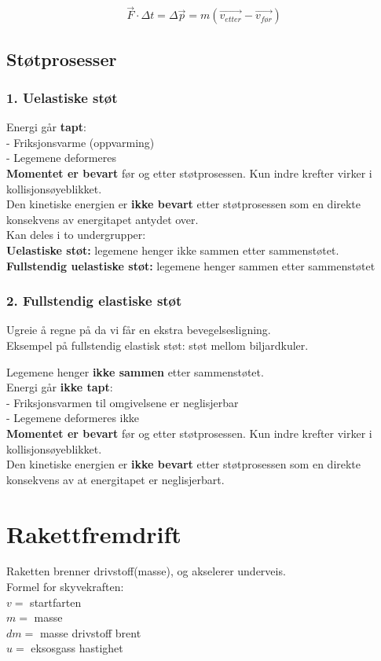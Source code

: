 \documentclass[12pt]{article}
\begin{document}
$$\Vec{F}\cdot \Delta t = \Delta \Vec{p} = m(\Vec{v_{etter}} - \Vec{v_{før}})$$


\subsection{Støtprosesser}
\bigskip
\subsubsection{1. Uelastiske støt}
Energi går \textbf{tapt}:\\
- Friksjonsvarme (oppvarming)\\
- Legemene deformeres\\
\bigskip
\textbf{Momentet er bevart} før og etter støtprosessen. Kun indre krefter virker i kollisjonsøyeblikket.\\
\bigskip
Den kinetiske energien er \textbf{ikke bevart} etter støtprosessen som en direkte konsekvens av energitapet antydet over.\\
\bigskip
 Kan deles i to undergrupper: \\
 \textbf{Uelastiske støt:} legemene henger ikke sammen etter sammenstøtet.\\
 \textbf{Fullstendig uelastiske støt:} legemene henger sammen etter sammenstøtet\\
 \bigskip
\subsubsection{2. Fullstendig elastiske støt}
Ugreie å regne på da vi får en ekstra bevegelsesligning.\\
Eksempel på fullstendig elastisk støt: støt mellom biljardkuler.

Legemene henger \textbf{ikke sammen} etter sammenstøtet.\\
\bigskip
Energi går \textbf{ikke tapt}:\\
- Friksjonsvarmen til omgivelsene er neglisjerbar\\
- Legemene deformeres ikke\\
\bigskip
\textbf{Momentet er bevart} før og etter støtprosessen. Kun indre krefter virker i kollisjonsøyeblikket.\\
\bigskip
Den kinetiske energien er \textbf{ikke bevart} etter støtprosessen som en direkte konsekvens av at energitapet er neglisjerbart.\\
\bigskip

\section{Rakettfremdrift}
Raketten brenner drivstoff(masse), og akselerer underveis.\\
\bigskip
Formel for skyvekraften:\\
$v =$ startfarten\\
$m =$ masse\\
$dm =$ masse drivstoff brent\\
$u =$ eksosgass hastighet\\
\end{document}
